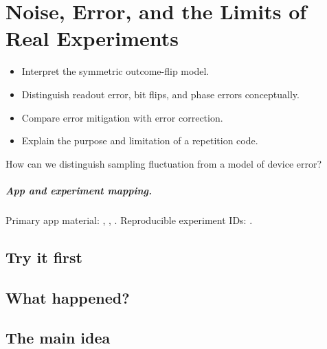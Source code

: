 \chapter[Noise and Error]{Noise, Error, and the Limits of Real Experiments}
\label{chap:noise-error-and-the-limits-of-real-experiments}

\begin{learningobjectives}
\begin{itemize}
  \item Interpret the symmetric outcome-flip model.
  \item Distinguish readout error, bit flips, and phase errors conceptually.
  \item Compare error mitigation with error correction.
  \item Explain the purpose and limitation of a repetition code.
\end{itemize}
\end{learningobjectives}

\begin{openingquestion}
How can we distinguish sampling fluctuation from a model of device error?
\end{openingquestion}

\paragraph{App and experiment mapping.}
Primary app material: , , . Reproducible experiment IDs:
.

\section{Try it first}
\begin{tryit}
\end{tryit}

\section{What happened?}

\section{The main idea}
\begin{coreidea}
\end{coreidea}

